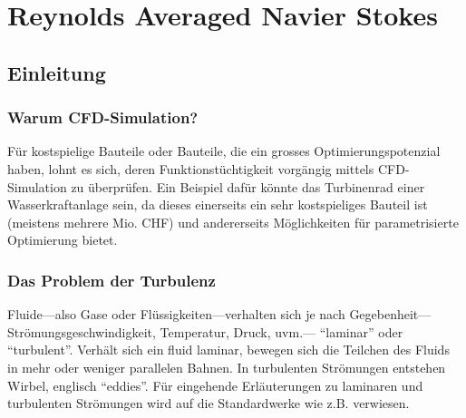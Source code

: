 %
%
%
%
\chapter{Reynolds Averaged Navier Stokes \label{chapter:reynolds}}
\begin{refsection}
%
%
%
%

\section{Einleitung}

\subsection{Warum CFD-Simulation?}

Für kostspielige Bauteile oder Bauteile, die ein grosses Optimierungspotenzial haben,
%
lohnt es sich, deren Funktionstüchtigkeit vorgängig mittels CFD-Simulation zu überprüfen.
%
Ein Beispiel dafür könnte das Turbinenrad einer Wasserkraftanlage sein,
%
%
da dieses einerseits ein sehr kostspieliges Bauteil ist (meistens mehrere Mio. CHF)
und andererseits Möglichkeiten für parametrisierte Optimierung bietet.
%

\subsection{Das Problem der Turbulenz}

Fluide---also Gase oder Flüssigkeiten---verhalten sich je nach Gegebenheit---Strömungs\-ge\-schwindigkeit, Temperatur, Druck, uvm.---
%
%
%
%
``laminar'' oder ``turbulent''. Verhält sich ein fluid laminar, bewegen sich die Teilchen des Fluids in mehr oder weniger
%
%
parallelen Bahnen. In turbulenten Strömungen entstehen Wirbel, englisch ``eddies''. Für eingehende Erläuterungen zu laminaren
%
%
und turbulenten Strömungen wird auf die Standardwerke wie z.B. \cite{reynolds:oertel} verwiesen.


\end{refsection}
